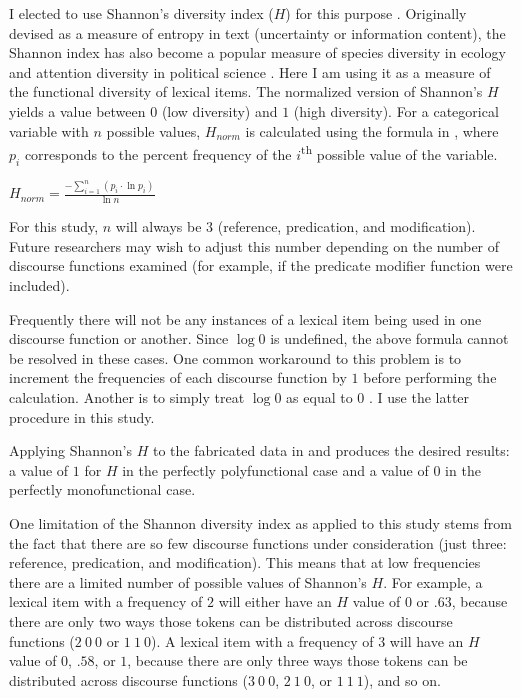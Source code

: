 I elected to use Shannon's diversity index ($H$) for this purpose \parencites{Shannon1948}{Shannon1951}. Originally devised as a measure of entropy in text (uncertainty or information content), the Shannon index has also become a popular measure of species diversity in ecology \parencites{Avolioetal2012} and attention diversity in political science \parencite{BoydstunBevanThomas2014}. Here I am using it as a measure of the functional diversity of lexical items. The normalized version of Shannon's $H$ yields a value between $0$ (low diversity) and $1$ (high diversity). For a categorical variable with $n$ possible values, $H_{norm}$ is calculated using the formula in , where $p_i$ corresponds to the percent frequency of the $i$\textsuperscript{th} possible value of the variable.

\begin{exe}
  \ex\label{ex:Shannon-H}
  $H_{norm} = \displaystyle\frac{-\displaystyle\sum_{i = 1}^{n}(p_i \cdot \ln p_i)}{\ln n}$
\end{exe}

\noindent For this study, $n$ will always be $3$ (reference, predication, and modification). Future researchers may wish to adjust this number depending on the number of discourse functions examined (for example, if the predicate modifier function were included).

Frequently there will not be any instances of a lexical item being used in one discourse function or another. Since $\log 0$ is undefined, the above formula cannot be resolved in these cases. One common workaround to this problem is to increment the frequencies of each discourse function by $1$ before performing the calculation. Another is to simply treat $\log 0$ as equal to $0$ \parencite[120--121]{Gries2013}. I use the latter procedure in this study.

Applying Shannon's $H$ to the fabricated data in  and  produces the desired results: a value of $1$ for $H$ in the perfectly polyfunctional case and a value of $0$ in the perfectly monofunctional case.

One limitation of the Shannon diversity index as applied to this study stems from the fact that there are so few discourse functions under consideration (just three: reference, predication, and modification). This means that at low frequencies there are a limited number of possible values of Shannon's $H$. For example, a lexical item with a frequency of $2$ will either have an $H$ value of $0$ or $.63$, because there are only two ways those tokens can be distributed across discourse functions ($2\ 0\ 0$ or $1\ 1\ 0$). A lexical item with a frequency of $3$ will have an $H$ value of $0$, $.58$, or $1$, because there are only three ways those tokens can be distributed across discourse functions ($3\ 0\ 0$, $2\ 1\ 0$, or $1\ 1\ 1$), and so on.

